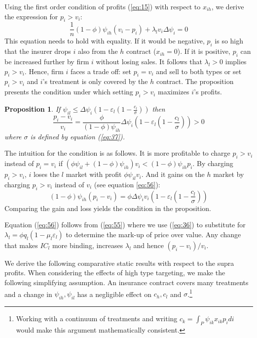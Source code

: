 \documentclass[12pt,english,a4paper]{article}
\newtheorem{proposition}{Proposition}
\begin{document}
Using the first order condition of profits (\ref{eq:15}) with respect to \(x_{ih}\), we derive the expression for \(p_i>v_i\):
\begin{equation}
\label{eq:55}
\frac{1}{n}(1-\phi)\psi_{ih}(v_i-p_i) + \lambda_l v_i \Delta \psi_i = 0
\end{equation}
This equation needs to hold with equality. If it would be negative, \(p_i\) is so high that the insurer drops \(i\) also from the \(h\) contract (\(x_{ih}=0\)). If it is positive, \(p_i\) can be increased further by firm \(i\) without losing sales. It follows that \(\lambda_l>0\) implies \(p_i>v_i\). Hence, firm \(i\) faces a trade off: set \(p_i=v_i\) and sell to both types or set \(p_i>v_i\) and \(i\)'s treatment is only covered by the \(h\) contract. The proposition presents the condition under which setting \(p_i>v_i\) maximizes \(i\)'s profits.

\begin{proposition}\label{prop:sep}
If $\psi_{il} \leq \Delta \psi_i (1-\varepsilon_l (1-\frac{c_l}{\sigma}))$ then
\begin{equation}
\label{eq:56}
\frac{p_i-v_i}{v_i} = \frac{\phi}{(1-\phi)\psi_{ih}} \Delta \psi_i (1-\varepsilon_l (1-\frac{c_l}{\sigma})) > 0
\end{equation}
where $\sigma$ is defined by equation (\ref{eq:37}).
\end{proposition}

The intuition for the condition is as follows. It is more profitable to charge \(p_i>v_i\) instead of \(p_i=v_i\) if \((\phi \psi_{il} + (1-\phi) \psi_{ih}) v_i < (1-\phi) \psi_{ih} p_i\). By charging \(p_i > v_i\), \(i\) loses the \(l\) market with profit \(\phi \psi_{il} v_i\). And it gains on the \(h\) market by charging \(p_i > v_i\) instead of \(v_i\) (see equation \ref{eq:56}):
\begin{equation}
\label{eq:63}
(1-\phi) \psi_{ih} (p_i-v_i)= \phi \Delta \psi_i v_i (1-\varepsilon_l (1-\frac{c_l}{\sigma}))
\end{equation}
Comparing the gain and loss yields the condition in the proposition.

Equation (\ref{eq:56}) follows from (\ref{eq:55}) where we use (\ref{eq:36}) to substitute for \(\lambda_l = \phi q_l (1-\mu_l \varepsilon_l)\) to determine the mark-up of price over value. Any change that makes \(IC_l\) more binding, increases \(\lambda_l\) and hence \((p_i-v_i)/v_i\).

We derive the following comparative static results with respect to the supra profits. When considering the effects of high type targeting, we make the following simplifying assumption. An insurance contract covers many treatments and a change in \(\psi_{ih},\psi_{il}\) has a negligible effect on \(c_h, c_l\) and \(\sigma\).\footnote{Working with a continuum of treatments and writing \(c_k = \int_P \psi_{ik}x_{ik}p_idi\) would make this argument mathematically consistent.}
\end{document}
